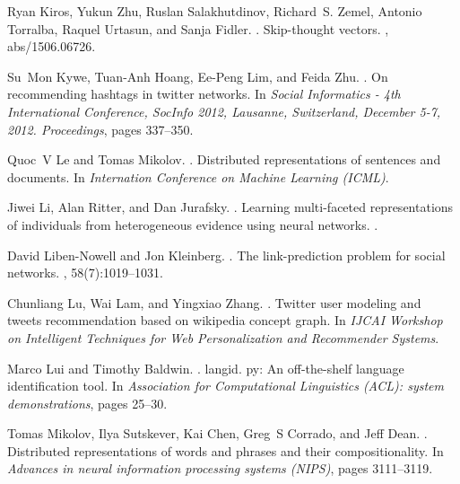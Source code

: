 \documentclass{article}
\begin{document}
\begin{thebibliography}{}
Ryan Kiros, Yukun Zhu, Ruslan Salakhutdinov, Richard~S. Zemel, Antonio
  Torralba, Raquel Urtasun, and Sanja Fidler.
.
\newblock Skip-thought vectors.
, abs/1506.06726.

Su~Mon Kywe, Tuan{-}Anh Hoang, Ee{-}Peng Lim, and Feida Zhu.
.
\newblock On recommending hashtags in twitter networks.
\newblock In {\em Social Informatics - 4th International Conference, SocInfo
  2012, Lausanne, Switzerland, December 5-7, 2012. Proceedings}, pages
  337--350.

Quoc~V Le and Tomas Mikolov.
.
\newblock Distributed representations of sentences and documents.
\newblock In {\em Internation Conference on Machine Learning (ICML)}.

Jiwei Li, Alan Ritter, and Dan Jurafsky.
.
\newblock Learning multi-faceted representations of individuals from
  heterogeneous evidence using neural networks.
.

David Liben-Nowell and Jon Kleinberg.
.
\newblock The link-prediction problem for social networks.
, 58(7):1019--1031.

Chunliang Lu, Wai Lam, and Yingxiao Zhang.
.
\newblock Twitter user modeling and tweets recommendation based on wikipedia
  concept graph.
\newblock In {\em IJCAI Workshop on Intelligent Techniques for Web
  Personalization and Recommender Systems}.

Marco Lui and Timothy Baldwin.
.
\newblock langid. py: An off-the-shelf language identification tool.
\newblock In {\em Association for Computational Linguistics (ACL): system
  demonstrations}, pages 25--30.

Tomas Mikolov, Ilya Sutskever, Kai Chen, Greg~S Corrado, and Jeff Dean.
.
\newblock Distributed representations of words and phrases and their
  compositionality.
\newblock In {\em Advances in neural information processing systems (NIPS)},
  pages 3111--3119.


\end{thebibliography}
\end{document}
